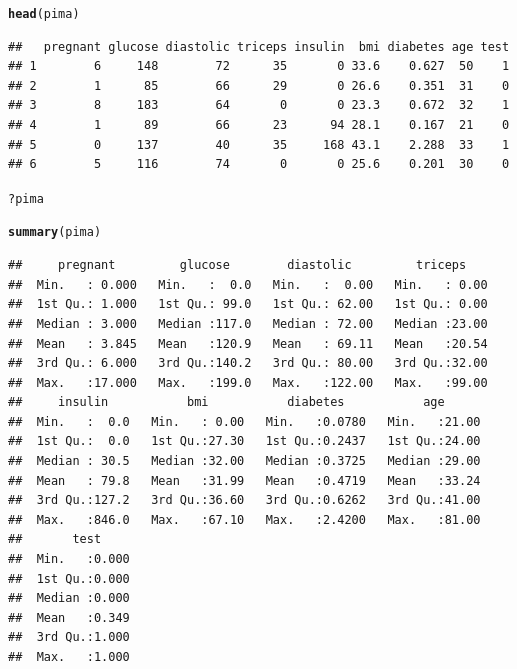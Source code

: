 \documentclass[11pt, a4paper]{article}\usepackage[]{graphicx}\usepackage[]{xcolor}
\makeatletter
\newcommand{\hlopt}[1]{\textcolor[rgb]{0,0,0}{#1}}%
\newcommand{\hlstd}[1]{\textcolor[rgb]{0.345,0.345,0.345}{#1}}%
\newcommand{\hlkwd}[1]{\textcolor[rgb]{0.737,0.353,0.396}{\textbf{#1}}}%
\newenvironment{kframe}{%
 \def\at@end@of@kframe{}%
 \ifinner\ifhmode%
  \def\at@end@of@kframe{\end{minipage}}%
  \begin{minipage}{\columnwidth}%
 \fi\fi%
 \def\FrameCommand##1{\hskip\@totalleftmargin \hskip-\fboxsep
 \colorbox{shadecolor}{##1}\hskip-\fboxsep
     \hskip-\linewidth \hskip-\@totalleftmargin \hskip\columnwidth}%
 \MakeFramed {\advance\hsize-\width
   \@totalleftmargin\z@ \linewidth\hsize
   \@setminipage}}%
 {\par\unskip\endMakeFramed%
 \at@end@of@kframe}
\newenvironment{knitrout}{}{} %
\makeatother
\begin{document}
\begin{knitrout}
\color{fgcolor}\begin{kframe}
\begin{alltt}
\hlkwd{head}\hlstd{(pima)}
\end{alltt}
\begin{verbatim}
##   pregnant glucose diastolic triceps insulin  bmi diabetes age test
## 1        6     148        72      35       0 33.6    0.627  50    1
## 2        1      85        66      29       0 26.6    0.351  31    0
## 3        8     183        64       0       0 23.3    0.672  32    1
## 4        1      89        66      23      94 28.1    0.167  21    0
## 5        0     137        40      35     168 43.1    2.288  33    1
## 6        5     116        74       0       0 25.6    0.201  30    0
\end{verbatim}
\end{kframe}
\end{knitrout}

\begin{knitrout}
\color{fgcolor}\begin{kframe}
\begin{alltt}
\hlopt{?}\hlstd{pima}
\end{alltt}


{\ttfamily\noindent\itshape\color{messagecolor}{\#\# starting httpd help server ... done}}\end{kframe}
\end{knitrout}

\begin{knitrout}
\color{fgcolor}\begin{kframe}
\begin{alltt}
\hlkwd{summary}\hlstd{(pima)}
\end{alltt}
\begin{verbatim}
##     pregnant         glucose        diastolic         triceps     
##  Min.   : 0.000   Min.   :  0.0   Min.   :  0.00   Min.   : 0.00  
##  1st Qu.: 1.000   1st Qu.: 99.0   1st Qu.: 62.00   1st Qu.: 0.00  
##  Median : 3.000   Median :117.0   Median : 72.00   Median :23.00  
##  Mean   : 3.845   Mean   :120.9   Mean   : 69.11   Mean   :20.54  
##  3rd Qu.: 6.000   3rd Qu.:140.2   3rd Qu.: 80.00   3rd Qu.:32.00  
##  Max.   :17.000   Max.   :199.0   Max.   :122.00   Max.   :99.00  
##     insulin           bmi           diabetes           age       
##  Min.   :  0.0   Min.   : 0.00   Min.   :0.0780   Min.   :21.00  
##  1st Qu.:  0.0   1st Qu.:27.30   1st Qu.:0.2437   1st Qu.:24.00  
##  Median : 30.5   Median :32.00   Median :0.3725   Median :29.00  
##  Mean   : 79.8   Mean   :31.99   Mean   :0.4719   Mean   :33.24  
##  3rd Qu.:127.2   3rd Qu.:36.60   3rd Qu.:0.6262   3rd Qu.:41.00  
##  Max.   :846.0   Max.   :67.10   Max.   :2.4200   Max.   :81.00  
##       test      
##  Min.   :0.000  
##  1st Qu.:0.000  
##  Median :0.000  
##  Mean   :0.349  
##  3rd Qu.:1.000  
##  Max.   :1.000
\end{verbatim}
\end{kframe}
\end{knitrout}
\end{document}
